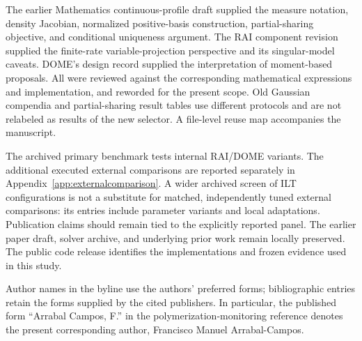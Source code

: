 The earlier Mathematics continuous-profile draft supplied the measure notation, density Jacobian, normalized positive-basis construction, partial-sharing objective, and conditional uniqueness argument. The RAI component revision supplied the finite-rate variable-projection perspective and its singular-model caveats. DOME's design record supplied the interpretation of moment-based proposals. All were reviewed against the corresponding mathematical expressions and implementation, and reworded for the present scope. Old Gaussian compendia and partial-sharing result tables use different protocols and are not relabeled as results of the new selector. A file-level reuse map accompanies the manuscript.

The archived primary benchmark tests internal RAI/DOME variants. The additional executed external comparisons are reported separately in Appendix~\ref{app:externalcomparison}. A wider archived screen of ILT configurations is not a substitute for matched, independently tuned external comparisons: its entries include parameter variants and local adaptations. Publication claims should remain tied to the explicitly reported panel. The earlier paper draft, solver archive, and underlying prior work remain locally preserved. The public code release identifies the implementations and frozen evidence used in this study.

Author names in the byline use the authors' preferred forms; bibliographic entries retain the forms supplied by the cited publishers. In particular, the published form ``Arrabal Campos, F.'' in the polymerization-monitoring reference denotes the present corresponding author, Francisco Manuel Arrabal-Campos.
